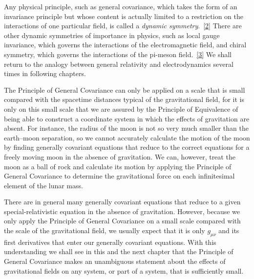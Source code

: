 Any physical principle, such as general covariance, which takes the form of an
invariance principle but whose content is actually limited to a restriction
on the interactions of one particular field, is called a \textit{dynamic
symmetry}.~\hyperref[ch4-ref-2]{[2]} There are other dynamic symmetries of
importance in physics, such as local gauge invariance, which governs the
interactions of the electromagnetic field, and chiral symmetry, which governs
the interactions of the pi-meson field.~\hyperref[ch4-ref-3]{[3]} We shall
return to the analogy between general relativity and electrodynamics several
times in following chapters.

The Principle of General Covariance can only be applied on a scale that is
small compared with the spacetime distances typical of the gravitational
field, for it is only on this small scale that we are assured by the Principle
of Equivalence of being able to construct a coordinate system in which the
effects of gravitation are absent. For instance, the radius of the moon is not
so very much smaller than the earth--moon separation, so we cannot accurately
calculate the motion of the moon by finding generally covariant equations that
reduce to the correct equations for a freely moving moon in the absence of
gravitation. We can, however, treat the moon as a ball of rock and calculate
its motion by applying the Principle of General Covariance to determine the
gravitational force on each infinitesimal element of the lunar mass.

There are in general many generally covariant equations that reduce to a given
special-relativistic equation in the absence of gravitation. However, because
we only apply the Principle of General Covariance on a small scale compared
with the scale of the gravitational field, we usually expect that it is only
\(g_{\mu\nu}\) and its first derivatives that enter our generally covariant
equations. With this understanding we shall see in this and the next chapter
that the Principle of General Covariance makes an unambiguous statement about
the effects of gravitational fields on any system, or part of a system, that
is sufficiently small.
